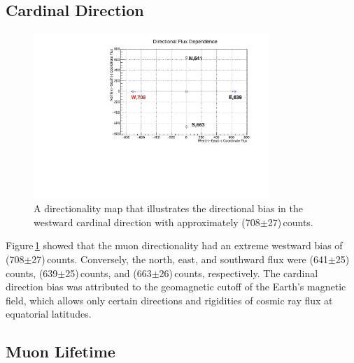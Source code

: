 \documentclass[aps,prl,twocolumn,superscriptaddress,nofootinbib]{revtex4-1}
\begin{document}
\subsection{Cardinal Direction}
\begin{figure}[h!]
  \begin{center}
\centerline{\includegraphics[width=3.5in]{direction2.pdf}}
\caption{ \small{A directionality map that illustrates the directional bias in the westward cardinal direction with approximately (708$\pm$27)\,counts. \label{cardinal}}}
  \end{center}
\end{figure}
\vspace{.1 mm}
Figure\,\ref{cardinal} showed that the muon directionality had an extreme westward bias of (708$\pm$27)\,counts. Conversely, the north, east, and southward flux were (641$\pm$25)\,counts, (639$\pm$25)\,counts, and (663$\pm$26)\,counts, respectively. The cardinal direction bias was attributed to the geomagnetic cutoff of the Earth's magnetic field, which allows only certain directions and rigidities of cosmic ray flux at equatorial latitudes.


\subsection{Muon Lifetime}
\end{document}
